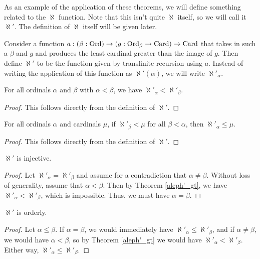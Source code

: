 \documentclass[../../math.tex]{subfiles}
\begin{document}
As an example of the application of these theorems, we will define something
related to the $\aleph$ function.  Note that this isn't quite $\aleph$ itself,
so we will call it $\aleph'$.  The definition of $\aleph$ itself will be given
later.

\begin{definition}
    Consider a function $a : (\beta : \operatorname{Ord}) \to (g : \operatorname{Ord}_\beta \to \operatorname{Card}) \to
    \operatorname{Card}$ that takes in such a $\beta$ and $g$ and produces the least cardinal
    greater than the image of $g$.  Then define $\aleph'$ to be the function
    given by transfinite recursion using $a$.  Instead of writing the
    application of this function as $\aleph'(\alpha)$, we will write
    $\aleph'_\alpha$.
\end{definition}

\begin{theorem} \label{aleph'_gt}
    For all ordinals $\alpha$ and $\beta$ with $\alpha < \beta$, we have
    $\aleph'_\alpha < \aleph'_\beta$.
\end{theorem}
\begin{proof}
    This follows directly from the definition of $\aleph'$.
\end{proof}

\begin{theorem} \label{aleph'_least}
    For all ordinals $\alpha$ and cardinals $\mu$, if $\aleph'_\beta < \mu$ for
    all $\beta < \alpha$, then $\aleph'_\alpha \leq \mu$.
\end{theorem}
\begin{proof}
    This follows directly from the definition of $\aleph'$.
\end{proof}

\begin{instance}
    $\aleph'$ is injective.
\end{instance}
\begin{proof}
    Let $\aleph'_\alpha = \aleph'_\beta$ and assume for a contradiction that
    $\alpha \neq \beta$.  Without loss of generality, assume that $\alpha <
    \beta$.  Then by Theorem \ref{aleph'_gt}, we have $\aleph'_\alpha <
    \aleph'_\beta$, which is impossible.  Thus, we must have $\alpha = \beta$.
\end{proof}

\begin{instance}
    $\aleph'$ is orderly.
\end{instance}
\begin{proof}
    Let $\alpha \leq \beta$.  If $\alpha = \beta$, we would immediately have
    $\aleph'_\alpha \leq \aleph'_\beta$, and if $\alpha \neq \beta$, we would
    have $\alpha < \beta$, so by Theorem \ref{aleph'_gt} we would have
    $\aleph'_\alpha < \aleph'_\beta$.  Either way, $\aleph'_\alpha \leq
    \aleph'_\beta$.
\end{proof}
\end{document}
